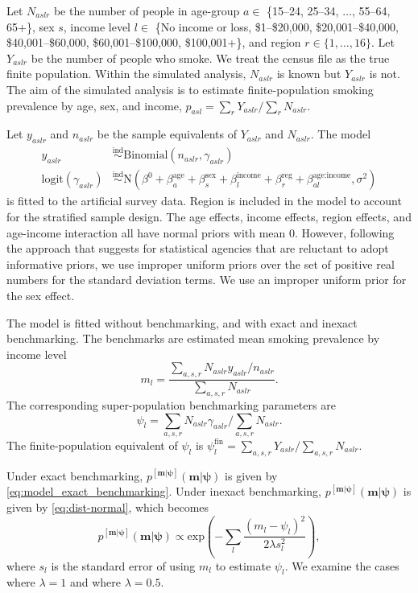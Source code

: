 \documentclass[12pt]{article}
\newcommand{\ind}{\stackrel{\text{ind}}{\sim}}
\begin{document}
Let $N_{aslr}$ be the number of people in age-group $a \in$ \{15--24, 25--34, $\dots$, 55--64, 65+\}, sex $s$, income level $l \in$ \{No income or loss, \$1--\$20,000, \$20,001--\$40,000, \$40,001--\$60,000, \$60,001--\$100,000, \$100,001+\}, and region $r \in \{1, \dots, 16\}$.  Let $Y_{aslr}$ be the number of people who smoke. We treat the census file as the true finite population.  Within the simulated analysis, $N_{aslr}$ is known but $Y_{aslr}$ is not.    The aim of the simulated analysis is to estimate finite-population smoking prevalence by age, sex, and income, $p_{asl} = \sum_r Y_{aslr} / \sum_r N_{aslr}$.

Let $y_{aslr}$ and $n_{aslr}$ be the sample equivalents of $Y_{aslr}$ and $N_{aslr}$.  The model
\begin{align}
  y_{aslr}  & \ind \text{Binomial} \left( n_{aslr}, \gamma_{aslr} \right) \\
  \text{logit}(\gamma_{aslr}) & \ind \text{N}\left( \beta^0 + \beta_a^{\text{age}} + \beta_s^{\text{sex}} + \beta_l^{\text{income}} + \beta_r^{\text{reg}} + \beta_{al}^{\text{age:income}}, \sigma^2 \right)
\end{align}
is fitted to the artificial survey data.  Region is included in the model to account for the stratified sample design.  The age effects, income effects, region effects, and age-income interaction all have normal priors with mean 0.  However, following the approach that \citet{little2012calibrated} suggests for statistical agencies that are reluctant to adopt informative priors, we use improper uniform priors over the set of positive real numbers for the standard deviation terms. We use an improper uniform prior for the sex effect.

The model is fitted without benchmarking, and with exact and inexact benchmarking.  The benchmarks are estimated mean smoking prevalence by income level $$m_l = \frac{\sum_{a,s,r} N_{aslr}y_{aslr}/n_{aslr}}{\sum_{a,s,r} N_{aslr}}.$$  The corresponding super-population benchmarking parameters are $$\psi_l=\sum_{a,s,r}N_{aslr}\gamma_{aslr}/\sum_{a,s,r}N_{aslr}.$$ The finite-population equivalent of $\psi_l$ is $\psi_l^{\text{fin}}=\sum_{a,s,r}Y_{aslr}/\sum_{a,s,r}N_{aslr}$.

Under exact benchmarking, $p^{[\bm{m}|\bm{\psi}]}(\bm{m} | \bm{\psi})$ is given by \eqref{eq:model_exact_benchmarking}.  Under inexact benchmarking, $p^{[\bm{m}|\bm{\psi}]}(\bm{m} | \bm{\psi})$ is given by \eqref{eq:dist-normal}, which becomes
\begin{equation}
p^{[\bm{m}|\bm{\psi}]}(\bm{m}|\bm{\psi})\propto \text{exp}\left( -\sum_l \frac{ (m_l-\psi_l)^2}{ 2 \lambda s_l^2} \right), \label{eq:dist-normal-smoking}
\end{equation}
where $s_l$ is the standard error of using $m_l$ to estimate $\psi_l$. We examine the cases where $\lambda=1$ and where $\lambda=0.5$.
\end{document}
